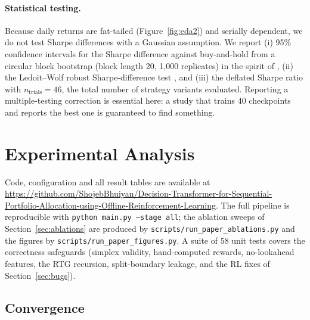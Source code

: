 \documentclass[11pt]{article}
\begin{document}
\paragraph{Statistical testing.}
Because daily returns are fat-tailed (Figure~\ref{fig:eda2}) and serially dependent, we do not
test Sharpe differences with a Gaussian assumption. We report (i) 95\% confidence intervals for
the Sharpe difference against buy-and-hold from a circular block bootstrap (block length 20,
1{,}000 replicates) in the spirit of \cite{politis1994stationary}, (ii) the Ledoit--Wolf robust
Sharpe-difference test \cite{ledoit2008robust}, and (iii) the deflated Sharpe ratio
\cite{bailey2014deflated} with $n_{\text{trials}} = 46$, the total number of strategy variants
evaluated. Reporting a multiple-testing correction is essential here: a study that trains 40
checkpoints and reports the best one is guaranteed to find something.

\section{Experimental Analysis}

Code, configuration and all result tables are available at\\
\url{https://github.com/ShojebBhuiyan/Decision-Transformer-for-Sequential-Portfolio-Allocation-using-Offline-Reinforcement-Learning}.
The full pipeline is reproducible with \texttt{python main.py --stage all}; the ablation sweeps
of Section~\ref{sec:ablations} are produced by \texttt{scripts/run\_paper\_ablations.py} and the
figures by \texttt{scripts/run\_paper\_figures.py}. A suite of 58 unit tests covers the
correctness safeguards (simplex validity, hand-computed rewards, no-lookahead features, the RTG
recursion, split-boundary leakage, and the RL fixes of Section~\ref{sec:bugs}).

\subsection{Convergence}
\end{document}
